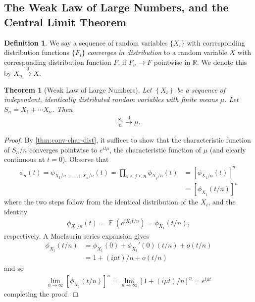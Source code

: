 \documentclass[12pt]{article}
\newcommand{\rr}{\mathbb{R}}
\DeclareMathOperator{\ex}{\mathbb{E}}
\theoremstyle{plain}
\newtheorem{theorem}{Theorem}
\theoremstyle{definition}
\newtheorem*{definition}{Definition}
\theoremstyle{remark}
\numberwithin{equation}{section}  %
\begin{document}
\subsection{The Weak Law of Large Numbers, and the Central Limit Theorem}
\begin{definition}
	We say a sequence of random variables $\{X_{i}\}$
	with corresponding distribution functions $\{F_{i}\}$
	\emph{converges in distribution} to a random variable $X$ with corresponding
	distribution function $F$, if $F_{n} \to F$ pointwise in $\rr$.
	We denote this by $X_{n} \xrightarrow{\text{d}} X$.
\end{definition}
\begin{theorem}[Weak Law of Large Numbers]\label{thm:weak-law}
	Let $\left\{ X_{i} \right\}$ be a sequence of independent, identically
	distributed random variables with finite means $\mu$. Let
	$S_{n} \doteq X_{1} + \cdots X_{n}$. Then
	\begin{equation*}
		\begin{split}
			\frac{S_{n}}{n} \xrightarrow{\text{d}} \mu.
		\end{split}
	\end{equation*}
\end{theorem}
\begin{proof}
	By \cref{thm:conv-char-dist}, it suffices to show that
	the characteristic function of $S_{n}/n$ converges
	pointwise to  $e^{it \mu}$, the characteristic function of $\mu$ (and clearly
	continuous at $t=0$). Observe that
	\begin{equation*}
		\begin{split}
			\phi_{n}(t) = \phi_{X_{1}/n + \ldots + X_{n}/n}(t)
			= \prod_{1 \le j \le n} \phi_{X_{j}/n}(t)
			& = \left[ \phi_{X_{1}/n}(t) \right]^{n}
			\\
			& = \left[ \phi_{X_{1}}(t/n) \right]^{n}
		\end{split}
	\end{equation*}
	where the two steps follow from the identical distribution of the $X_{i}$,
	and the identity
	\begin{equation*}
		\begin{split}
			\phi_{X_{1}/n}(t) = \ex(e^{i X_{1} t /n}) = \phi_{X_{1}}(t/n),
		\end{split}
	\end{equation*}
	respectively. A Maclaurin series expansion gives
	\begin{equation*}
		\begin{split}
			\phi_{X_{1}}(t/n) & = \phi_{X_{1}}(0) + \phi_{X_{1}}'(0)(t/n) + o(t/n)
			\\
			& = 1 + (i \mu t)/n + o(t/n)
		\end{split}
	\end{equation*}
	and so
	\begin{equation*}
		\begin{split}
			\lim_{n \to \infty} \left[ \phi_{X_{1}}(t/n) \right]^{n}
			= \lim_{n \to \infty} \left[ 1 + (i \mu t)/n \right]^{n} = e^{i \mu t}
		\end{split}
	\end{equation*}
	completing the proof.
\end{proof}
\end{document}
